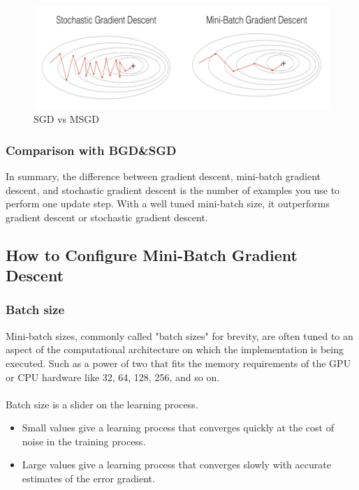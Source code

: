 \documentclass[cjk]{beamer}
\begin{document}
\begin{CJK*}{GBK}{kai}
\begin{frame}
\begin{figure}
	\begin{minipage}[t]{0.6\linewidth}
		\centering
		\includegraphics[width= \textwidth]{c2.png}
		\caption{SGD vs MSGD}
	\end{minipage}
\end{figure}
\end{frame}

\begin{frame}
\frametitle{Comparison with BGD\&SGD}
\begin{block}{}
In summary, the difference between gradient descent, mini-batch gradient descent, and stochastic gradient descent is the number of examples you use to perform one update step. With a well tuned mini-batch size, it outperforms gradient descent or stochastic gradient descent.
\end{block}
\end{frame}

\subsection{How to Configure Mini-Batch Gradient Descent}
\begin{frame}
\frametitle{Batch size}
Mini-batch sizes, commonly called "batch sizes" for brevity, are often tuned to an aspect of the computational architecture on which the implementation is being executed. Such as a power of two that fits the memory requirements of the GPU or CPU hardware like 32, 64, 128, 256, and so on.\\
~\\
Batch size is a slider on the learning process.
\begin{itemize}
\item Small values give a learning process that converges quickly at the cost of noise in the training process.
\item Large values give a learning process that converges slowly with accurate estimates of the error gradient.
\end{itemize}
\end{frame}


\end{CJK*}
\end{document}
